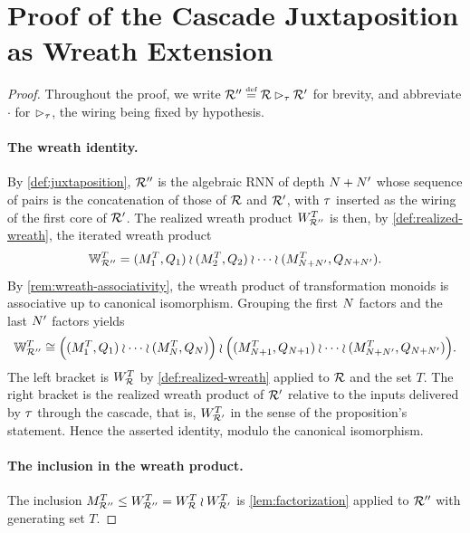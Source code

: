 \documentclass{article}
\begin{document}
\section{Proof of the Cascade Juxtaposition as Wreath Extension}\label{sec:Cascjuxtaposition}

\propCascjuxtaposition*

\begin{proof}
    
Throughout the proof, we write $\mathcal{R}'' \mathrel{\stackrel{\textnormal{\tiny def}}{=}} \mathcal{R} \mathbin{\rhd_{\tau}} \mathcal{R}'$ for brevity, and abbreviate $\cdot$ for $\mathbin{\rhd_{\tau}}$, the wiring being fixed by hypothesis.

\paragraph{The wreath identity.}
By \cref{def:juxtaposition}, $\mathcal{R}''$ is the algebraic RNN of depth $N + N'$ whose sequence of pairs is the concatenation of those of $\mathcal{R}$ and $\mathcal{R}'$, with $\tau$ inserted as the wiring of the first core of $\mathcal{R}'$. 
The realized wreath product $W_{\mathcal{R}''}^T$ is then, by \cref{def:realized-wreath}, the iterated wreath product
$$
\mathbb{W}_{\mathcal{R}''}^T = (M_1^T, Q_1) \wr (M_2^T, Q_2) \wr \cdots \wr (M_{N + N'}^T, Q_{N + N'}).
$$
By \cref{rem:wreath-associativity}, the wreath product of transformation monoids is associative up to canonical isomorphism. 
Grouping the first $N$ factors and the last $N'$ factors yields
$$
\mathbb{W}_{\mathcal{R}''}^T \cong \Bigl( (M_1^T, Q_1) \wr \cdots \wr (M_N^T, Q_N) \Bigr) \wr \Bigl( (M_{N+1}^T, Q_{N+1}) \wr \cdots \wr (M_{N+N'}^T, Q_{N+N'}) \Bigr).
$$
The left bracket is $W_{\mathcal{R}}^T$ by \cref{def:realized-wreath} applied to $\mathcal{R}$ and the set $T$. 
The right bracket is the realized wreath product of $\mathcal{R}'$ relative to the inputs delivered by $\tau$ through the cascade, that is, $W_{\mathcal{R}'}^T$ in the sense of the proposition's statement. 
Hence the asserted identity, modulo the canonical isomorphism.

\paragraph{The inclusion in the wreath product.}
The inclusion $M_{\mathcal{R}''}^T \leq W_{\mathcal{R}''}^T = W_{\mathcal{R}}^T \wr W_{\mathcal{R}'}^T$ is \cref{lem:factorization} applied to $\mathcal{R}''$ with generating set $T$.


\end{proof}
\end{document}
